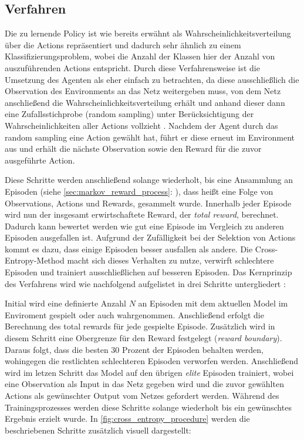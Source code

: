 \documentclass[11pt]{scrartcl}
\begin{document}
\subsection{Verfahren} %
Die zu lernende Policy ist wie bereits erwähnt als Wahrscheinlichkeitsverteilung
über die Actions repräsentiert und dadurch sehr ähnlich zu einem Klassifizierungsproblem,
wobei die Anzahl der Klassen hier der Anzahl von auszuführenden Actions entspricht. Durch
diese Verfahrensweise ist die Umsetzung des Agenten als eher einfach zu betrachten, da
diese ausschließlich die Observation des Environments an das Netz weitergeben muss, von
dem Netz anschließend die Wahrscheinlichkeitsverteilung erhält und anhand dieser dann eine
Zufallsstichprobe (random sampling) unter Berücksichtigung der Wahrscheinlichkeiten aller
Actions vollzieht \cite[~S.78]{L2018}. Nachdem der Agent durch das random sampling eine
Action gewählt hat, führt er diese erneut im Environment aus und erhält die nächste
Observation sowie den Reward für die zuvor ausgeführte Action.

Diese Schritte werden anschließend solange wiederholt, bis eine Ansammlung an Episoden (siehe 
\autoref{sec:markov_reward_process}: ), dass heißt eine Folge
von Observations, Actions und Rewards, gesammelt wurde. Innerhalb jeder Episode wird nun der
insgesamt erwirtschaftete Reward, der \textit{total reward}, berechnet. Dadurch kann bewertet werden
wie gut eine Episode im Vergleich zu anderen Episoden ausgefallen ist. Aufgrund der Zufälligkeit
bei der Selektion von Actions kommt es dazu, dass einige Episoden besser ausfallen als andere.
Die Cross-Entropy-Method macht sich dieses Verhalten zu nutze, verwirft schlechtere Episoden und
trainiert ausschließlichen auf besseren Episoden. Das Kernprinzip des Verfahrens wird wie nachfolgend
aufgelistet in drei Schritte untergliedert \cite[~S.80 f.]{L2018}:

Initial wird eine definierte Anzahl $N$ an Episoden mit dem aktuellen Model im Enviroment gespielt
oder auch wahrgenommen. Anschließend erfolgt die Berechnung des total rewards für jede gespielte
Episode. Zusätzlich wird in diesem Schritt eine Obergrenze für den Reward festgelegt 
(\textit{reward boundary}). Daraus folgt, dass die besten 30 Prozent der Episoden behalten werden,
wohingegen die restlichten schlechteren Episoden verworfen werden. Anschließend wird im letzen Schritt
das Model auf den übrigen \textit{elite} Episoden trainiert, wobei eine Observation als Input in das
Netz gegeben wird und die zuvor gewählten Actions als gewünschter Output vom Netzes gefordert werden.
Während des Trainingsprozesses werden diese Schritte solange wiederholt bis ein gewünschtes
Ergebnis erzielt wurde. In \autoref{fig:cross_entropy_procedure} werden die beschriebenen Schritte
zusätzlich visuell dargestellt:
\end{document}
